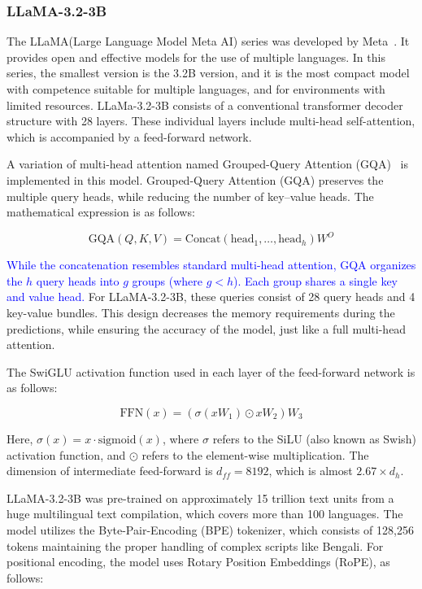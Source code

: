 \documentclass[10pt,letterpaper]{article}
\newcommand{\rev}[1]{\textcolor{blue}{#1}}
\begin{document}
\subsubsection*{LLaMA-3.2-3B}

The LLaMA(Large Language Model Meta AI) series was developed by Meta~\cite{b36}. It provides open and effective models for the use of multiple languages. In this series, the smallest version is the 3.2B version, and it is the most compact model with competence suitable for multiple languages, and for environments with limited resources. LLaMa-3.2-3B consists of a conventional transformer decoder structure with 28 layers. These individual layers include multi-head self-attention, which is accompanied by a feed-forward network.

A variation of multi-head attention named Grouped-Query Attention (GQA)~\cite{b42} is implemented in this model. Grouped-Query Attention (GQA) preserves the multiple query heads, while reducing the number of key–value heads. The mathematical expression is as follows:    

\begin{equation}
\text{GQA}(Q,K,V)=\text{Concat}(\text{head}_1,\dots,\text{head}_h)W^O
\label{eq:gqa}
\end{equation}

\rev{While the concatenation resembles standard multi-head attention, GQA organizes the \(h\) query heads into \(g\) groups (where \(g < h\)). Each group shares a single key and value head.} For LLaMA-3.2-3B, these queries consist of 28 query heads and 4 key-value bundles. This design decreases the memory requirements during the predictions, while ensuring the accuracy of the model, just like a full multi-head attention. 

The SwiGLU activation function used in each layer of the feed-forward network is as follows: 

\begin{equation}
\text{FFN}(x) = (\sigma(xW_1) \odot xW_2)W_3
\label{eq:swiglu}
\end{equation}

Here, \(\sigma(x) = x \cdot \text{sigmoid}(x)\), where \(\sigma\) refers to the SiLU (also known as Swish) activation function, and \(\odot\) refers to the element-wise multiplication. The dimension of intermediate feed-forward is \(d_{ff} = 8192\), which is almost \(2.67 \times d_h\).

LLaMA-3.2-3B was pre-trained on approximately 15 trillion text units from a huge multilingual text compilation, which covers more than 100 languages. The model utilizes the Byte-Pair-Encoding (BPE) tokenizer, which consists of 128,256 tokens maintaining the proper handling of complex scripts like Bengali. For positional encoding, the model uses Rotary Position Embeddings (RoPE), as follows:
\end{document}
